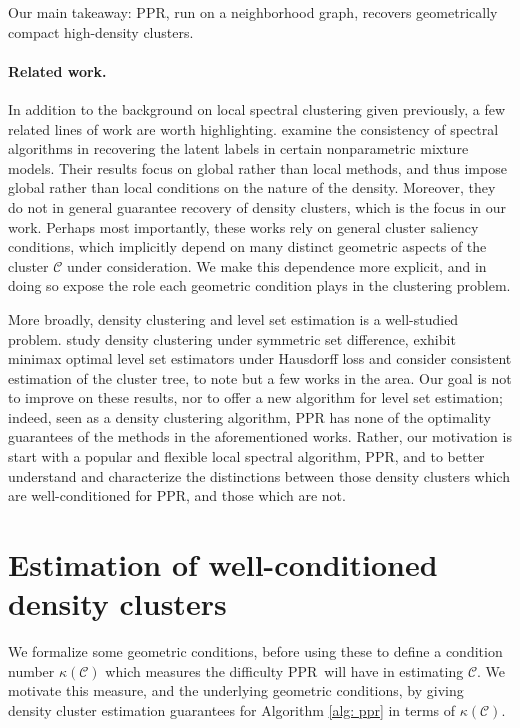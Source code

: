 \documentclass{article}
\newcommand{\1}{\mathbf{1}}
\newcommand{\Cset}{\mathcal{C}}
\newcommand{\pprspace}{{\sc PPR~}}
\theoremstyle{aldenthm}
\theoremstyle{aldenrmrk}
\begin{document}
Our main takeaway: PPR, run on a neighborhood graph, recovers geometrically
compact high-density clusters. 

\paragraph{Related work.} In addition to the background on local spectral
clustering given previously, a few related lines of work are worth
highlighting. \citep{shi2009,schiebinger2015} examine the consistency of  
spectral algorithms in recovering the latent labels in certain
nonparametric mixture models. Their results focus on global rather than local 
methods, and thus impose global rather than local conditions on the nature
of the density. Moreover, they do not in general guarantee recovery of density 
clusters, which is the focus in our work. Perhaps most importantly, these works
rely on general cluster saliency conditions, which implicitly depend on many
distinct geometric aspects of the cluster $\Cset$ under consideration. We make
this dependence more explicit, and in doing so expose the role each geometric
condition plays in the clustering problem. 

More broadly, density clustering and level set estimation is a well-studied
problem. \citet{polonik1995, rigollet2009} study density clustering under
symmetric set difference, \citet{tsybakov1997, singh2009} exhibit minimax
optimal level set estimators under Hausdorff loss and \citet{hartigan1981,
  chaudhuri2010} consider consistent estimation of the cluster tree, to note but
a few works in the area. Our goal is not to improve on these results, nor to 
offer a new algorithm for level set estimation; indeed, seen as a density
clustering algorithm, PPR has none of the optimality guarantees of the
methods in the aforementioned works. Rather, our motivation is start with a 
popular  and flexible local spectral algorithm, PPR, and to better understand
and characterize the distinctions between those density clusters which are 
well-conditioned for PPR, and those which are not.  

\section{Estimation of well-conditioned density clusters}
\label{sec: consistent_cluster_estimation_with_ppr}

We formalize some geometric conditions, before using these to define a condition number $\kappa(\Cset)$ which measures the difficulty \pprspace will have in estimating $\Cset$. We motivate this measure, and the underlying geometric conditions, by giving density cluster estimation guarantees for Algorithm \ref{alg: ppr} in terms of $\kappa(\Cset)$.
\end{document}
